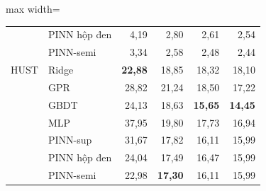 \begin{table}[!htbp]
\begin{adjustbox}{max width=\textwidth}
\begin{tabular}{llrrrr}
 & PINN hộp đen & 4{,}19 & 2{,}80 & 2{,}61 & 2{,}54 \\
 & PINN-semi & 3{,}34 & 2{,}58 & 2{,}48 & 2{,}44 \\
\addlinespace[3pt]
HUST & Ridge & \textbf{22{,}88} & 18{,}85 & 18{,}32 & 18{,}10 \\
 & GPR & 28{,}82 & 21{,}24 & 18{,}50 & 17{,}22 \\
 & GBDT & 24{,}13 & 18{,}63 & \textbf{15{,}65} & \textbf{14{,}45} \\
 & MLP & 37{,}95 & 19{,}80 & 17{,}73 & 16{,}94 \\
 & PINN-sup & 31{,}67 & 17{,}82 & 16{,}11 & 15{,}99 \\
 & PINN hộp đen & 24{,}04 & 17{,}49 & 16{,}47 & 15{,}99 \\
 & PINN-semi & 22{,}98 & \textbf{17{,}30} & 16{,}11 & 15{,}99 \\
\bottomrule\end{tabular}\end{adjustbox}\end{table}
